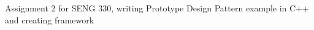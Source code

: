 Assignment 2 for S\+E\+N\+G 330, writing Prototype Design Pattern example in C++ and creating framework 